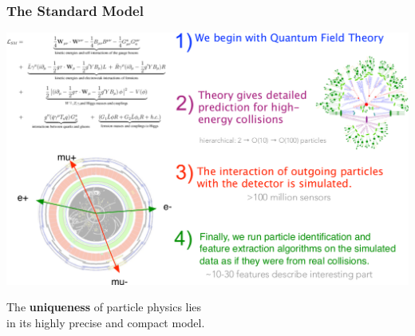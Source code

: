 \documentclass{beamer}
\begin{document}
\begin{frame}
    \frametitle{The Standard Model}

    \begin{center}
        \includegraphics[width=\textwidth]{figures/model.png}

        \vspace{0.5cm}
        The {\bf \color{red} uniqueness} of particle physics lies\\
         in its highly precise and compact model.
    \end{center}

\end{frame}



\begin{frame}
\end{frame}
\end{document}

